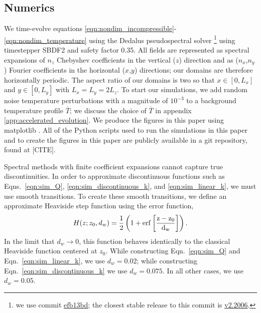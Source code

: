 \documentclass{aastex631}
\begin{document}
\subsection{Numerics}
We time-evolve equations \ref{eqn:nondim_incompressible}-\ref{eqn:nondim_temperature} using the Dedalus pseudospectral solver \citep{burns_etal_2020}\footnote{we use commit \href{https://github.com/DedalusProject/dedalus/commit/efb13bdaa09816dde3eee897bc2a15fc284ea2f1}{efb13bd}; the closest stable release to this commit is \href{https://github.com/DedalusProject/dedalus/releases/tag/v2.2006}{v2.2006}.} using timestepper SBDF2 \citep{wang&ruuth2008} and safety factor 0.35.
All fields are represented as spectral expansions of $n_z$ Chebyshev coefficients in the vertical ($z$) direction and as ($n_x$,$n_y$) Fourier coefficients in the horizontal ($x$,$y$) directions; our domains are therefore horizontally periodic.
The aspect ratio of our domains is two so that $x \in [0, L_x]$ and $y \in [0, L_y]$ with $L_x = L_y = 2 L_z$.
To start our simulations, we add random noise temperature perturbations with a magnitude of $10^{-3}$ to a background temperature profile $\overline{T}$; we discuss the choice of $\overline{T}$ in appendix \ref{app:accelerated_evolution}.
We produce the figures in this paper using matplotlib \citep{hunter2007, mpl3.3.4}.
All of the Python scripts used to run the simulations in this paper and to create the figures in this paper are publicly available in a git repository, found at [CITE].

Spectral methods with finite coefficient expansions cannot capture true discontinuities.
In order to approximate discontinuous functions such as Eqns.~\ref{eqn:sim_Q}, \ref{eqn:sim_discontinuous_k}, and \ref{eqn:sim_linear_k}, we must use smooth transitions.
To create these smooth transitions, we define an approximate Heaviside step function using the error function,
\begin{equation}
H(z; z_0, d_w) = \frac{1}{2}\left(1 + \rm{erf}\left[\frac{z - z_0}{d_w}\right]\right).
\label{eqn:heaviside}
\end{equation}
In the limit that $d_w \rightarrow 0$, this function behaves identically to the classical Heaviside function centered at $z_0$.
While constructing Eqn.~\ref{eqn:sim_Q} and Eqn.~\ref{eqn:sim_linear_k}, we use $d_w = 0.02$; while constructing Eqn.~\ref{eqn:sim_discontinuous_k} we use $d_w = 0.075$.
In all other cases, we use $d_w = 0.05$.
\end{document}
